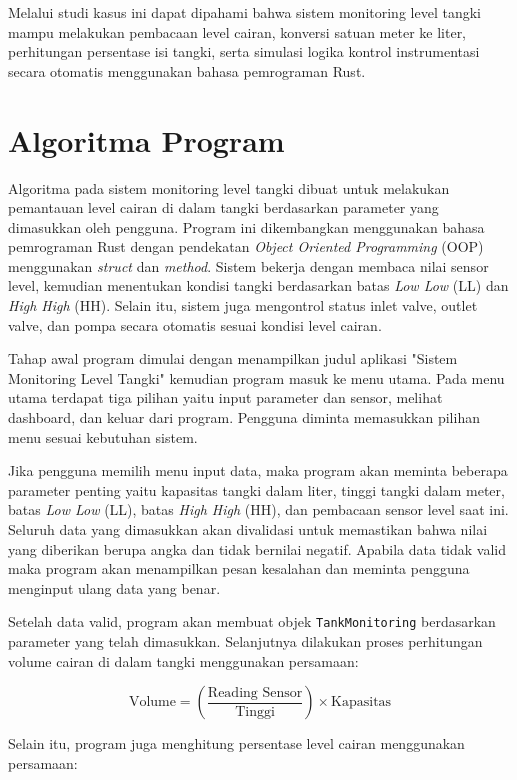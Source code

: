\documentclass[12pt,a4paper]{article}
\begin{document}
Melalui studi kasus ini dapat dipahami bahwa sistem monitoring level tangki mampu melakukan pembacaan level cairan, konversi satuan meter ke liter, perhitungan persentase isi tangki, serta simulasi logika kontrol instrumentasi secara otomatis menggunakan bahasa pemrograman Rust.

\section{Algoritma Program}

Algoritma pada sistem monitoring level tangki dibuat untuk melakukan pemantauan level cairan di dalam tangki berdasarkan parameter yang dimasukkan oleh pengguna. Program ini dikembangkan menggunakan bahasa pemrograman Rust dengan pendekatan \textit{Object Oriented Programming} (OOP) menggunakan \textit{struct} dan \textit{method}. Sistem bekerja dengan membaca nilai sensor level, kemudian menentukan kondisi tangki berdasarkan batas \textit{Low Low} (LL) dan \textit{High High} (HH). Selain itu, sistem juga mengontrol status inlet valve, outlet valve, dan pompa secara otomatis sesuai kondisi level cairan.

Tahap awal program dimulai dengan menampilkan judul aplikasi "Sistem Monitoring Level Tangki" kemudian program masuk ke menu utama. Pada menu utama terdapat tiga pilihan yaitu input parameter dan sensor, melihat dashboard, dan keluar dari program. Pengguna diminta memasukkan pilihan menu sesuai kebutuhan sistem.

Jika pengguna memilih menu input data, maka program akan meminta beberapa parameter penting yaitu kapasitas tangki dalam liter, tinggi tangki dalam meter, batas \textit{Low Low} (LL), batas \textit{High High} (HH), dan pembacaan sensor level saat ini. Seluruh data yang dimasukkan akan divalidasi untuk memastikan bahwa nilai yang diberikan berupa angka dan tidak bernilai negatif. Apabila data tidak valid maka program akan menampilkan pesan kesalahan dan meminta pengguna menginput ulang data yang benar.

Setelah data valid, program akan membuat objek \texttt{TankMonitoring} berdasarkan parameter yang telah dimasukkan. Selanjutnya dilakukan proses perhitungan volume cairan di dalam tangki menggunakan persamaan:

$$\text{Volume} = \left(\frac{\text{Reading Sensor}}{\text{Tinggi}}\right) \times \text{Kapasitas}$$

Selain itu, program juga menghitung persentase level cairan menggunakan persamaan:
\end{document}
